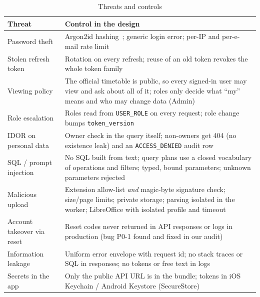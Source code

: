 \begin{table}[H]
\centering
\caption{Threats and controls}
\label{tab:security}
\small
\begin{tabularx}{\textwidth}{@{}p{3.6cm}X@{}}
\toprule
\textbf{Threat} & \textbf{Control in the design}\\
\midrule
Password theft & Argon2id hashing~\cite{biryukov2016}; generic login error; per-IP and per-e-mail rate limit\\
Stolen refresh token & Rotation on every refresh; reuse of an old token revokes the whole token family\\
Viewing policy & The official timetable is public, so every signed-in user may view and ask about all of it; roles only decide what ``my'' means and who may change data (Admin)\\
Role escalation & Roles read from \texttt{USER\_ROLE} on every request; role change bumps \texttt{token\_version}\\
IDOR on personal data & Owner check in the query itself; non-owners get 404 (no existence leak) and an \texttt{ACCESS\_DENIED} audit row\\
SQL / prompt injection & No SQL built from text; query plans use a closed vocabulary of operations and filters; typed, bound parameters; unknown parameters rejected\\
Malicious upload & Extension allow-list \emph{and} magic-byte signature check; size/page limits; private storage; parsing isolated in the worker; LibreOffice with isolated profile and timeout\\
Account takeover via reset & Reset codes never returned in API responses or logs in production (bug P0-1 found and fixed in our audit)\\
Information leakage & Uniform error envelope with request id; no stack traces or SQL in responses; no tokens or free text in logs\\
Secrets in the app & Only the public API URL is in the bundle; tokens in iOS Keychain / Android Keystore (SecureStore)\\
\bottomrule
\end{tabularx}
\end{table}
